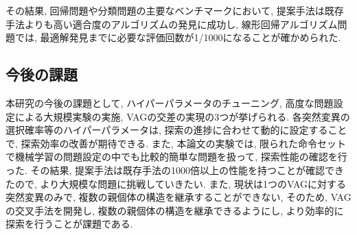 \documentclass[a4paper,11pt,twocolumn]{jarticle}
\begin{document}
その結果, 回帰問題や分類問題の主要なベンチマークにおいて, 提案手法は既存手法よりも高い適合度のアルゴリズムの発見に成功し, 線形回帰アルゴリズム問題では, 最適解発見までに必要な評価回数が1/1000になることが確かめられた.

\subsection{今後の課題}
本研究の今後の課題として, ハイパーパラメータのチューニング, 高度な問題設定による大規模実験の実施, VAGの交差の実現の3つが挙げられる. 各突然変異の選択確率等のハイパーパラメータは, 探索の進捗に合わせて動的に設定することで, 探索効率の改善が期待できる. また, 本論文の実験では, 限られた命令セットで機械学習の問題設定の中でも比較的簡単な問題を扱って, 探索性能の確認を行った. その結果, 提案手法は既存手法の1000倍以上の性能を持つことが確認できたので, より大規模な問題に挑戦していきたい. また, 現状は1つのVAGに対する突然変異のみで, 複数の親個体の構造を継承することができない, そのため, VAGの交叉手法を開発し, 複数の親個体の構造を継承できるようにし, より効率的に探索を行うことが課題である.



\end{document}
